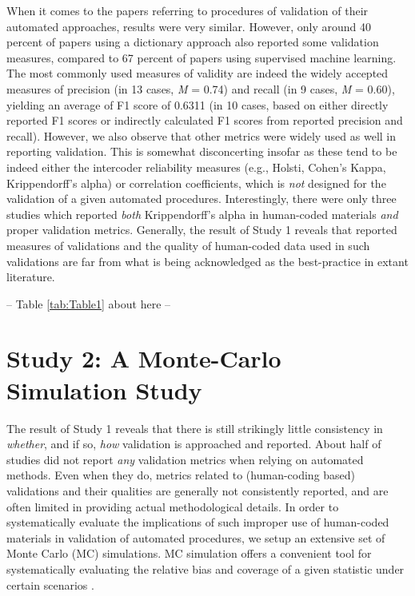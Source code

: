 \documentclass[man, 12pt, a4paper, nolmodern, noextraspace]{apa6}
\begin{document}
    When it comes to the papers referring to procedures of validation of their automated approaches, results were very similar. However, only around 40 percent of papers using a dictionary approach also reported some validation measures, compared to 67 percent of papers using supervised machine learning. The most commonly used measures of validity are indeed the widely accepted measures of precision (in 13 cases, \textit{M} = 0.74) and recall (in 9 cases, \textit{M} = 0.60), yielding an average of F1 score of 0.6311 (in 10 cases, based on either directly reported F1 scores or indirectly calculated F1 scores from reported precision and recall). However, we also observe that other metrics were widely used as well in reporting validation. This is somewhat disconcerting insofar as these tend to be indeed either the intercoder reliability measures (e.g., Holsti, Cohen’s Kappa, Krippendorff’s alpha) or correlation coefficients, which is \textit{not} designed for the validation of a given automated procedures. Interestingly, there were only three studies which reported \textit{both} Krippendorff’s alpha in human-coded materials \textit{and} proper validation metrics. Generally, the result of Study 1 reveals that reported measures of validations and the quality of human-coded data used in such validations are far from what is being acknowledged as the best-practice in extant literature.
    \centerline{ -- Table \ref{tab:Table1} about here -- }    

\section{Study 2: A Monte-Carlo Simulation Study}
    
    The result of Study 1 reveals that there is still strikingly little consistency in \textit{whether}, and if so, \textit{how} validation is approached and reported. About half of studies did not report \textit{any} validation metrics when relying on automated methods. Even when they do, metrics related to (human-coding based) validations and their qualities are generally not consistently reported, and are often limited in providing actual methodological details. In order to systematically evaluate the implications of such improper use of human-coded materials in validation of automated procedures, we setup an extensive set of Monte Carlo (MC) simulations. MC simulation offers a convenient tool for systematically evaluating the relative bias and coverage of a given statistic under certain scenarios \parencites[][]{scharkow2017measurement, leemann2017extending}.
    
\end{document}
